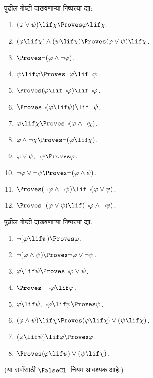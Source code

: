 \begin{prob}
पुढील गोष्टी दाखवणाऱ्या निष्पत्त्या द्या:
\begin{enumerate}
\item $(\varphi \lor \psi) \lif \chi \Proves \varphi \lif \chi$.
\item $(\varphi \lif \chi) \land (\psi \lif \chi) \Proves (\varphi \lor \psi) \lif \chi$.
\item $\Proves \lnot(\varphi \land \lnot \varphi)$.
\item $\psi \lif \varphi \Proves \lnot \varphi \lif \lnot \psi$.
\item $\Proves (\varphi \lif \lnot \varphi) \lif \lnot \varphi$.
\item $\Proves \lnot(\varphi \lif \psi) \lif \lnot \psi$.
\item $\varphi \lif \chi \Proves \lnot (\varphi \land \lnot \chi)$.
\item $\varphi \land \lnot \chi \Proves \lnot (\varphi \lif \chi)$.
\item $\varphi \lor \psi, \lnot \psi \Proves \varphi$.
\item $\lnot \varphi \lor \lnot \psi \Proves \lnot(\varphi \land \psi)$.
\item $\Proves (\lnot \varphi \land \lnot \psi) \lif\lnot(\varphi \lor \psi)$.
\item $\Proves \lnot(\varphi \lor \psi) \lif (\lnot \varphi \land \lnot \psi)$.
\end{enumerate}
\end{prob}
\begin{prob}
पुढील गोष्टी दाखवणाऱ्या निष्पत्त्या द्या:
\begin{enumerate}
\item $\lnot(\varphi \lif \psi) \Proves \varphi$.
\item $\lnot(\varphi \land \psi) \Proves \lnot \varphi \lor \lnot \psi$.
\item $\varphi \lif \psi \Proves \lnot \varphi \lor \psi$.
\item $\Proves \lnot \lnot \varphi \lif \varphi$.
\item $\varphi \lif \psi, \lnot \varphi \lif \psi \Proves \psi$.
\item $(\varphi \land \psi) \lif \chi \Proves (\varphi \lif \chi) \lor (\psi \lif \chi)$.
\item $(\varphi \lif \psi) \lif \varphi \Proves \varphi$.
\item $\Proves (\varphi \lif \psi) \lor (\psi \lif \chi)$.
\end{enumerate}
(या सर्वांसाठी $\FalseCl$~नियम आवश्यक आहे.)
\end{prob}
